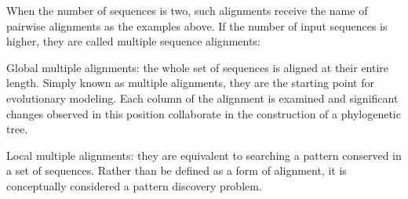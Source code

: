 When the number of sequences is two, such alignments receive the name of pairwise alignments
as the examples above. If the number of input sequences is higher, they are called multiple sequence
alignments:

\begin{mitemize}
\item
Global multiple alignments: the whole set of sequences is aligned at their entire length.
Simply known as multiple alignments, they are the starting point for evolutionary modeling. Each 
column of the alignment is examined and significant changes observed in this position collaborate 
in the construction of a phylogenetic tree. 
\begin{center}
\end{center}

\item
Local multiple alignments: they are equivalent to searching a pattern conserved in a set of sequences.
Rather than be defined as a form of alignment, it is conceptually considered a pattern discovery 
problem.

\begin{center}
\end{center}
\end{mitemize}


